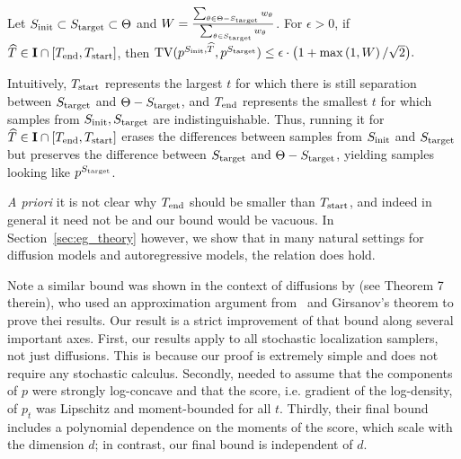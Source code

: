 \begin{theorem}\label{thm:masters_theorem} 
Let $S_{\mathrm{init}}\subset S_{\mathrm{target}} \subset \Theta$ and $W=\frac{\sum_{\theta \in \Theta-S_{\mathrm{target}}} w_\theta}{\sum_{\theta \in S_{\mathrm{target}}} w_\theta}$. For $\epsilon > 0$, if $\widehat{T}\in \mathbf{I} \cap [T_{\mathrm{end}},T_{\mathrm{start}}]$, then  
$\TV(\modrevlaw{\Sinit}{\wh{T}}{}, p^{\Send}) \leq \epsilon\cdot\bigl(1+\max\left(1,W\right)/\sqrt{2}\bigr).$
\end{theorem}
Intuitively, $T_{\mathrm{start}}$ represents the largest $t$ for which there is still separation between $S_{\mathrm{target}}$ and $\Theta-S_{\mathrm{target}}$, and $T_{\mathrm{end}}$ represents the smallest $t$ for which samples from $S_{\mathrm{init}},S_{\mathrm{target}}$ are indistinguishable. Thus, running it for $\widehat{T}\in \mathbf{I} \cap [T_{\mathrm{end}},T_{\mathrm{start}}]$ erases the differences between samples from $S_{\mathrm{init}}$ and $S_{\mathrm{target}}$ but preserves the difference between $S_{\mathrm{target}}$ and $\Theta-S_{\mathrm{target}}$, yielding samples looking like $p^{S_{\mathrm{target}}}$.
\begin{remark}
\emph{A priori} it is not clear why $T_{\mathrm{end}}$ should be smaller than $T_{\mathrm{start}}$, and indeed in general it need not be and our bound would be vacuous. In Section~\ref{sec:eg_theory} however, we show that in many natural settings for diffusion models and autoregressive models, the relation does hold.
\end{remark}
\begin{remark}
Note a similar bound was shown in the context of diffusions by \cite{li2024criticalwindowsnonasymptotictheory} (see Theorem 7 therein), who used an approximation argument from~\cite{DBLP:conf/iclr/ChenC0LSZ23} and Girsanov's theorem to prove thei results. Our result is a strict improvement of that bound along several important axes. First, our results apply to all stochastic localization samplers, not just diffusions. This is because our proof is extremely simple and does not require any stochastic calculus. Secondly, \cite{li2024criticalwindowsnonasymptotictheory} needed to assume that the components of $p$ were strongly log-concave and that the score, i.e. gradient of the log-density, of $p_t$ was Lipschitz and moment-bounded for all $t$. Thirdly, their final bound includes a polynomial dependence on the moments of the score, which scale with the dimension $d$; in contrast, our final bound is independent of $d$. 

\end{remark}


